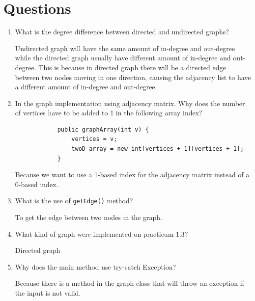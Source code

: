 \documentclass[12pt,titlepage]{article}
\begin{document}
\section{Questions}
\begin{enumerate}
    \item {
        What is the degree difference between directed and undirected graphs?

        Undirected graph will have the same amount of in-degree and out-degree while the 
        directed graph usually have different amount of in-degree and out-degree. This is because
        in directed graph there will be a directed edge between two nodes moving in one direction,
        causing the adjacency list to have a different amount of in-degree and out-degree.
    }
    \pagebreak
    \item {
        In the graph implementation using adjacency matrix. Why does the number of vertices have to be added
        to 1 in the following array index?

        \begin{verbatim}
            public graphArray(int v) {
                vertices = v;
                twoD_array = new int[vertices + 1][vertices + 1];
            }
        \end{verbatim}

        Because we want to use a 1-based index for the adjacency matrix instead of a 0-based index.
    }
    \item {
        What is the use of \texttt{getEdge()} method?

        To get the edge between two nodes in the graph.
    }
    \item {
        What kind of graph were implemented on practicum 1.3?

        Directed graph
    }
    \item {
        Why does the main method use try-catch Exception?

        Because there is a method in the graph class that will throw an exception if the input is not valid.
    }
\end{enumerate}
\end{document}
